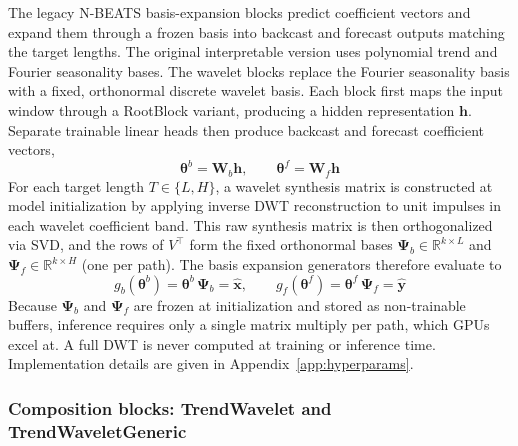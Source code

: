 \documentclass[11pt,a4paper]{article}
\begin{document}
The legacy N-BEATS basis-expansion blocks predict coefficient vectors and expand them through a frozen basis into backcast and forecast outputs matching the target lengths. The original interpretable version uses polynomial trend and Fourier seasonality bases. The wavelet blocks replace the Fourier seasonality basis with a fixed, orthonormal discrete wavelet basis. Each block first maps the input window through a RootBlock variant, producing a hidden representation $\mathbf{h}$. Separate trainable linear heads then produce backcast and forecast coefficient vectors,
\begin{equation*}
\boldsymbol{\theta}^b = \mathbf{W}_b\mathbf{h},\qquad \boldsymbol{\theta}^f = \mathbf{W}_f\mathbf{h}
\end{equation*}
For each target length $T \in \{L, H\}$, a wavelet synthesis matrix is constructed at model initialization by applying inverse DWT reconstruction to unit impulses in each wavelet coefficient band. This raw synthesis matrix is then orthogonalized via SVD, and the rows of $V^\top$ form the fixed orthonormal bases $\boldsymbol{\Psi}_b \in \mathbb{R}^{k \times L}$ and $\boldsymbol{\Psi}_f \in \mathbb{R}^{k \times H}$ (one per path). The basis expansion generators therefore evaluate to
\begin{equation*}
g_b(\boldsymbol{\theta}^b) = \boldsymbol{\theta}^b\,\boldsymbol{\Psi}_b = \hat{\mathbf{x}}, \qquad g_f(\boldsymbol{\theta}^f) = \boldsymbol{\theta}^f\,\boldsymbol{\Psi}_f = \hat{\mathbf{y}}
\end{equation*}
Because $\boldsymbol{\Psi}_b$ and $\boldsymbol{\Psi}_f$ are frozen at initialization and stored as non-trainable buffers, inference requires only a single matrix multiply per path, which GPUs excel at. A full DWT is never computed at training or inference time. Implementation details are given in Appendix~\ref{app:hyperparams}.

\subsubsection{Composition blocks: TrendWavelet and TrendWaveletGeneric}
\end{document}
